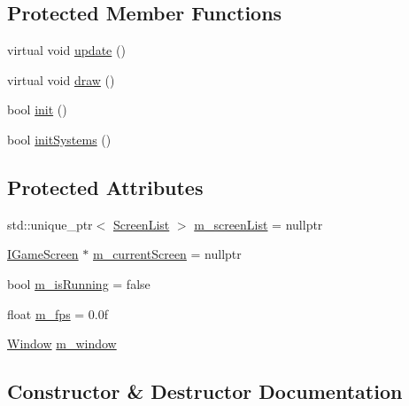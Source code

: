 \subsection*{Protected Member Functions}
\begin{DoxyCompactItemize}
\item 
virtual void \hyperlink{class_otherwise_1_1_i_main_game_aa5a8c900c9fb1a8574ae00269060b9a7}{update} ()
\item 
virtual void \hyperlink{class_otherwise_1_1_i_main_game_a59c95822091dadfe7ed59de30b5d4d5f}{draw} ()
\item 
bool \hyperlink{class_otherwise_1_1_i_main_game_aaa5b8aea58011bbf9388e71c13111998}{init} ()
\item 
bool \hyperlink{class_otherwise_1_1_i_main_game_ab7d6c71af1f1a69c98232ec656a4991b}{init\+Systems} ()
\end{DoxyCompactItemize}
\subsection*{Protected Attributes}
\begin{DoxyCompactItemize}
\item 
std\+::unique\+\_\+ptr$<$ \hyperlink{class_otherwise_1_1_screen_list}{Screen\+List} $>$ \hyperlink{class_otherwise_1_1_i_main_game_a95b6ec2b8e5e6810bdab4b156d2192df}{m\+\_\+screen\+List} = nullptr
\item 
\hyperlink{class_otherwise_1_1_i_game_screen}{I\+Game\+Screen} $\ast$ \hyperlink{class_otherwise_1_1_i_main_game_a9f1c425bf1399b5e29da01a7a118640a}{m\+\_\+current\+Screen} = nullptr
\item 
bool \hyperlink{class_otherwise_1_1_i_main_game_a3e43c135614e86b28746448d004d0617}{m\+\_\+is\+Running} = false
\item 
float \hyperlink{class_otherwise_1_1_i_main_game_a65d7ad2d2c2d9259bc2dd39b6a1953ed}{m\+\_\+fps} = 0.\+0f
\item 
\hyperlink{class_otherwise_1_1_window}{Window} \hyperlink{class_otherwise_1_1_i_main_game_ac7a18e4bb3f7a4060cc815bbbf5e04cf}{m\+\_\+window}
\end{DoxyCompactItemize}


\subsection{Constructor \& Destructor Documentation}
\mbox{\label{class_otherwise_1_1_i_main_game_a7c7022f55c7c337012e2a2807bdcc7be}} 

